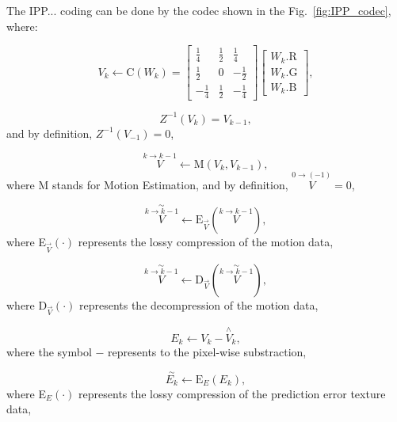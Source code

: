 The IPP... coding can be done by the codec shown in the
Fig.~\ref{fig:IPP_codec}, where:

\begin{equation}
  V_k \leftarrow \text{C}(W_k) =
  \begin{bmatrix}
    \frac{1}{4} &  \frac{1}{2}  &  \frac{1}{4} \\ 
    \frac{1}{2} &            0  & -\frac{1}{2} \\
    -\frac{1}{4} &  \frac{1}{2}  & -\frac{1}{4}
  \end{bmatrix}
  \begin{bmatrix}
    W_k.\text{R} \\
    W_k.\text{G} \\
    W_k.\text{B}
  \end{bmatrix}
  , \tag{a}
\end{equation}

\begin{equation}
  Z^{-1}(V_k) = V_{k-1},
  \tag{b}
\end{equation}
and by definition, $Z^{-1}(V_{-1}) = 0$,

\begin{equation}
  \overset{k\rightarrow k-1}{V} \leftarrow \text{M}(V_k, V_{k-1}),
  \tag{c}
\end{equation}
where M stands for Motion Estimation, and by definition,
$\overset{0\rightarrow (-1)}{V}=0$,

\begin{equation}
  \overset{\sim}{\overset{k\rightarrow k-1}{V}} \leftarrow \text{E}_{\overset{\rightarrow}{V}}(\overset{k\rightarrow k-1}{V}),
  \tag{d}
\end{equation}
where E$_{\overset{\rightarrow}{V}}(\cdot)$ represents the lossy
  compression of the motion data,

\begin{equation}
  \overset{\sim}{\overset{k\rightarrow k-1}{V}} \leftarrow \text{D}_{\overset{\rightarrow}{V}}(\overset{\sim}{\overset{k\rightarrow k-1}{V}}),
  \tag{e}
\end{equation}
where D$_{\overset{\rightarrow}{V}}(\cdot)$ represents the 
decompression of the motion data,

\begin{equation}
  E_k \leftarrow V_k - \overset{\wedge}{{V}}_k,
  \tag{f}
\end{equation}
where the symbol $-$ represents to the pixel-wise substraction,

\begin{equation}
  \overset{\sim}{E_k} \leftarrow \text{E}_{E}(E_k),
  \tag{g}
\end{equation}
where E$_{E}(\cdot)$ represents the lossy compression of the
prediction error texture data,


